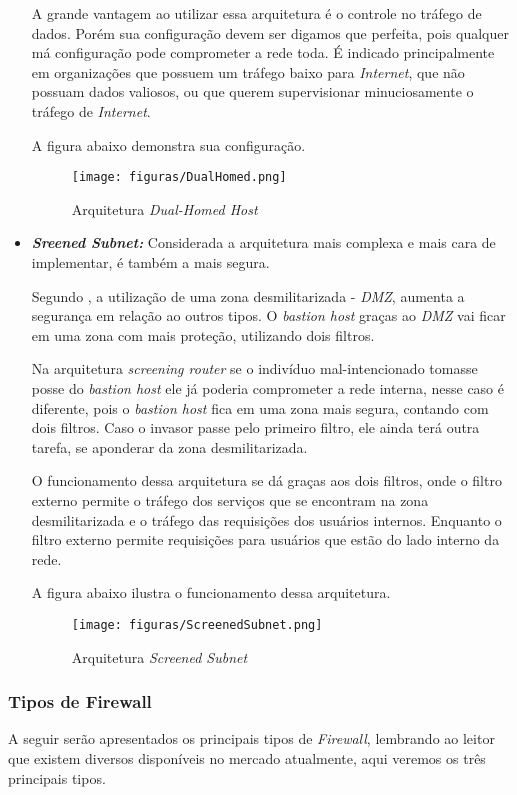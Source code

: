\begin{itemize}
A grande vantagem ao utilizar essa arquitetura é o controle no tráfego de dados. Porém sua configuração devem ser digamos que perfeita, pois qualquer má configuração pode comprometer a rede toda. É indicado principalmente em organizações que possuem um tráfego baixo para \textit{Internet}, que não possuam dados valiosos, ou que querem supervisionar minuciosamente o tráfego de \textit{Internet}.

A figura abaixo demonstra sua configuração.

\begin{figure}[!h]
\centering
\texttt{[image: figuras/DualHomed.png]}
\caption{Arquitetura \textit{Dual-Homed Host}} 	
\end{figure}

\item \textbf{\textit{Sreened Subnet:}} Considerada a arquitetura mais complexa e mais cara de implementar, é também a mais segura. 

Segundo , a utilização de uma zona desmilitarizada - \textit{DMZ}, aumenta a segurança em relação ao outros tipos. O \textit{bastion host} graças ao \textit{DMZ} vai ficar em uma zona com mais proteção, utilizando dois filtros.

Na arquitetura \textit{screening router} se o indivíduo mal-intencionado tomasse posse do \textit{bastion host} ele já poderia comprometer a rede interna, nesse caso é diferente, pois o \textit{bastion host} fica em uma zona mais segura, contando com dois filtros. Caso o invasor passe pelo primeiro filtro, ele ainda terá outra tarefa, se aponderar da zona desmilitarizada.

O funcionamento dessa arquitetura se dá graças aos dois filtros, onde o filtro externo permite o tráfego dos serviços que se encontram na zona desmilitarizada e o tráfego das requisições dos usuários internos. Enquanto o filtro externo permite requisições para usuários que estão do lado interno da rede.

A figura abaixo ilustra o funcionamento dessa arquitetura.

\begin{figure}[!h]
\centering
\texttt{[image: figuras/ScreenedSubnet.png]}
\caption{Arquitetura \textit{Screened Subnet}} 	
\end{figure}

\end{itemize}

\subsubsection{Tipos de Firewall}
A seguir serão apresentados os principais tipos de \textit{Firewall}, lembrando ao leitor que existem diversos disponíveis no mercado atualmente, aqui veremos os três principais tipos.


